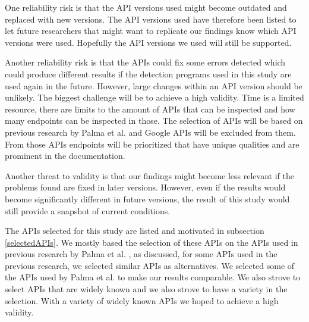 One reliability risk is that the API versions used might become outdated and replaced with new versions. The API versions used have therefore been listed to let future researchers that might want to replicate our findings know which API versions were used. Hopefully the API versions we used will still be supported.

Another reliability risk is that the APIs could fix some errors detected which could produce different results if the detection programs used in this study are used again in the future. However, large changes within an API version should be unlikely. 
The biggest challenge will be to achieve a high validity. Time is a limited resource, there are limits to the amount of APIs that can be inspected and how many endpoints can be inspected in those. The  selection of APIs will be based on previous research by Palma et al. \cite{linguistic} and Google APIs will be excluded from them. From those APIs endpoints will be prioritized that have unique qualities and are prominent in the documentation. 

Another threat to validity is that our findings might become less relevant if the problems found are fixed in later versions. However, even if the results would become significantly different in future versions, the result of this study would still provide a snapshot of current conditions. 

The APIs selected for this study are listed and motivated in subsection \ref{selectedAPIs}. We mostly based the selection of these APIs on the APIs used in previous research by Palma et al. \cite{design}\cite{linguistic}, as discussed, for some APIs used in the previous research, we selected similar APIs as alternatives. We selected some of the APIs used by Palma et al. to make our results comparable. We also strove to select APIs that are widely known and we also strove to have a variety in the selection. With a variety of widely known APIs we hoped to achieve a high validity.

\newpage